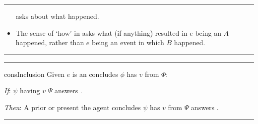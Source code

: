 \documentclass[10pt]{article}
\newcommand\lLine{{\color{lightgray} \noindent\rule{\textwidth}{0.4pt}}}
\newcommand\sepLine{
  \vfill
  \par\noindent\rule{\textwidth}{0.4pt}%
  \vspace{-10pt}%
  \par\noindent\rule{\textwidth}{0.4pt}
  \vfill}
\newcommand{\hand}{\ding{43}}
\begin{document}
\lLine

\begin{note}
  \begin{itemize}
  \item[\hand]
    \qHow{} asks about what happened.
  \end{itemize}

  \begin{itemize}
  \item
    The sense of `how' in \qHow{} asks what (if anything) resulted in \(e\) being an \eiw{} \(A\) happened, rather than \(e\) being an event in which \(B\) happened.
  \end{itemize}
\end{note}

\sepLine

\begin{note}
  \begin{constraint}{consInclusion}{\issueInclusion{}}
    Given \(e\) is an  \vAgent{} concludes \prop{} \(\phi\) has \val{} \(v\) from \pool{} \(\Phi\):
    \begin{itenum}
    \item[\emph{If}:]
       \(\psi\) having \val{} \(v\) \fingf{} \pool{} \(\Psi\) answers \qWhy{}.
    \item[\emph{Then}:]
      A prior or present  the agent concludes \(\psi\) has \val{} \(v\) from \pool{} \(\Psi\) answers \qHow{}.
    \end{itenum}
    \vspace{-\baselineskip}
  \end{constraint}
\end{note}

\begin{comment}
  This is where some important work is done.
  The thing is, this is set up in a careful way.
  \fofr{3} answer both \qWhy{} and \qHow{}.
  So, it's possible for a \fofr{} between a \prop{0}-\val{0} pair and \pool{} distinct from the \prop{0}-\val{0}-\pool{0} pair directly related to the conclusion to answer both \qWhy{} and \qHow{}.

  Key observation is that if the agent has not concluded \(\pv{\psi}{v'}\) from \(\Psi\) then \(\pv{\psi}{v'}\) \fof{} \(\Psi\) does not answer \qHow{}.
\end{comment}

\lLine
\end{document}
